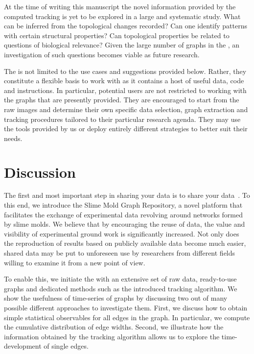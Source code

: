 	At the time of writing this manuscript the novel information provided by the computed tracking is yet to be explored in a large and systematic study. What can be inferred from the topological changes recorded? Can one identify patterns with certain structural properties? Can topological properties be related to questions of biological relevance? Given the large number of graphs in the \SMGR, an investigation of such questions becomes viable as future research.

	The \data is not limited to the use cases and suggestions provided below. Rather, they constitute a flexible basis to work with as it contains a host of useful data, code and instructions. In particular, potential users are not restricted to working with the graphs that are presently provided. They are encouraged to start from the raw images and determine their own specific data selection, graph extraction and tracking procedures tailored to their particular research agenda. They may use the tools provided by us or deploy entirely different strategies to better suit their needs.

\section{Discussion}

	The first and most important step in sharing your data is to share your data~\cite{white2013nine}. To this end, we introduce the Slime Mold Graph Repository, a novel platform that facilitates the exchange of experimental data revolving around networks formed by slime molds. We believe that by encouraging the reuse of data, the value and visibility of experimental ground work is significantly increased. Not only does the reproduction of results based on publicly available data become much easier, shared data may be put to unforeseen use by researchers from different fields willing to examine it from a new point of view.

	To enable this, we initiate the \SMGR with an extensive set of raw data, ready-to-use graphs and dedicated methods such as the introduced tracking algorithm. We show the usefulness of time-series of graphs by discussing two out of many possible different approaches to investigate them. First, we discuss how to obtain simple statistical observables for all edges in the graph. In particular, we compute the cumulative distribution of edge widths. Second, we illustrate how the information obtained by the tracking algorithm allows us to explore the time-development of single edges.

